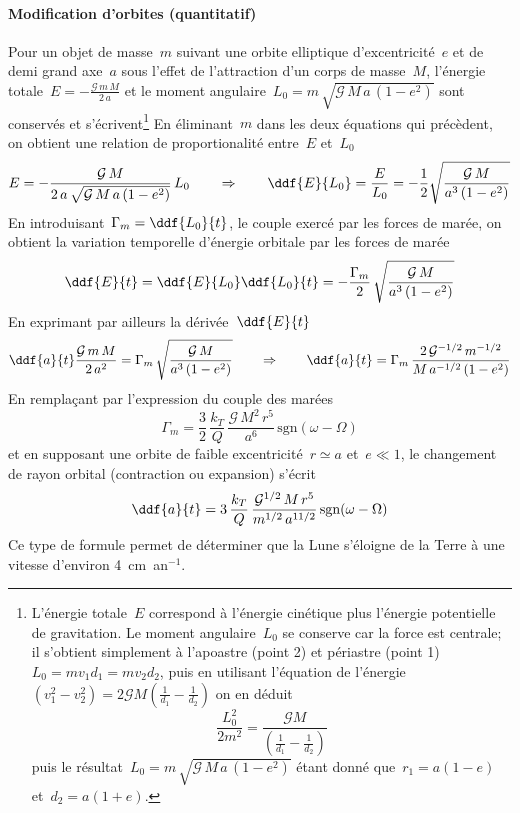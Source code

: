 \paragraph{Modification d'orbites (quantitatif)} Pour un objet de masse~$m$ suivant une orbite elliptique d'excentricité~$e$ et de demi grand axe~$a$ sous l'effet de l'attraction d'un corps de masse~$M$, l'énergie totale~$E = - \frac{\mathcal{G}\,m\,M}{2\,a}$ et le moment angulaire~$L_0 = m \, \sqrt{\mathcal{G}\,M\,a\,(1-e^2)}$ sont conservés et s'écrivent\footnote{L'énergie totale~$E$ correspond à l'énergie cinétique
plus l'énergie potentielle de gravitation.
Le moment angulaire~$L_0$ se conserve car la force est centrale; 
il s'obtient simplement à l'apoastre (point 2) et périastre (point 1)
$L_0 = m v_1 d_1 = m v_2 d_2$, puis en utilisant
l'équation de l'énergie~$\left( v_1^2 - v_2^2 \right) = 2 \mathcal{G} M \left( \frac{1}{d_1} - \frac{1}{d_2} \right)$
on en déduit
\[ \frac{L_0^2}{2 m^2} = \frac{\mathcal{G}M}{(\frac{1}{d_1}-\frac{1}{d_2})} \]
puis le résultat~$L_0 = m \, \sqrt{\mathcal{G}\,M\,a\,(1-e^2)}$
étant donné que~$r_1 = a (1-e)$ et~$d_2 = a (1+e)$.}
En éliminant~$m$ dans les deux équations qui précèdent, on obtient une relation de proportionalité entre~$E$ et~$L_0$
\[ E = - \frac{\mathcal{G}\,M}{2\,a\,\sqrt{\mathcal{G} \, M \, a \, (1-e^2)}} \,L_0 \qquad \Rightarrow \qquad \ddf{E}{L_0} = \frac{E}{L_0} = - \frac{1}{2} \sqrt{ \frac{\mathcal{G}\,M}{a^3 \, (1-e^2)} } \]
En introduisant~$\Gamma_m = \ddf{L_0}{t}$, le couple exercé par les forces de marée, on obtient la variation temporelle d'énergie orbitale par les forces de marée
\[ \ddf{E}{t} = \ddf{E}{L_0} \ddf{L_0}{t} = - \frac{\Gamma_m}{2} \, \sqrt{ \frac{\mathcal{G}\,M}{a^3 \, (1-e^2) } } \]
\noindent En exprimant par ailleurs la dérivée~$\ddf{E}{t}$
\[
\ddf{a}{t} \frac{\mathcal{G}\,m\,M}{2\,a^2} = \Gamma_m \, \sqrt{ \frac{\mathcal{G}\,M}{a^3 \, (1-e^2) } }
\qquad \Rightarrow \qquad
\ddf{a}{t} = \Gamma_m \, \frac{2\,\mathcal{G}^{-1/2}\,m^{-1/2}}{M \, a^{-1/2} \, (1-e^2) }
\]
\noindent En remplaçant par l'expression du couple des marées 
\[ \Gamma_m = \frac{3}{2} \, \frac{k_T}{Q} \, \frac{\mathcal{G}\,M^2\,r^5}{a^6} \, \textrm{sgn}(\omega-\Omega) \]
et en supposant une orbite de faible excentricité~$r \simeq a$ et~$e \ll 1$, le changement de rayon orbital (contraction ou expansion) s'écrit
\[
\ddf{a}{t} = 3 \, \frac{k_T}{Q} \, \frac{\mathcal{G}^{1/2}\,M\,r^5}{m^{1/2} \, a^{11/2} } \, \textrm{sgn}(\omega-\Omega)
\]
Ce type de formule permet de déterminer que la Lune s'éloigne de la Terre à une vitesse d'environ 4~cm~an$^{-1}$.

